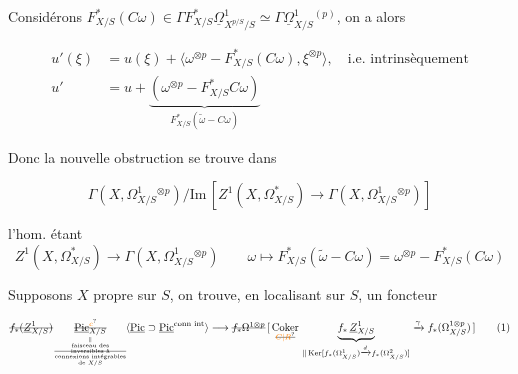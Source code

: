 



Considérons $F_{X/S}^*(C\omega)\in\Gamma F_{X/S}^*\underline\Omega^1_{X^{p/S}/S}\simeq\Gamma\underline\Omega^1_{X/S}{}^{(p)}$, on a alors

\[
\begin{aligned}
u'(\xi)&=u(\xi)+\langle\omega^{\otimes p}-F_{X/S}^*(C\omega),\xi^{\otimes p}\rangle,\quad\text{i.e. intrinsèquement}\\
u'&=u+\underbrace{(\omega^{\otimes p}-F_{X/S}^*C\omega)}_{F^*_{X/S}(\widetilde\omega-C\omega)}
\end{aligned}
\]

Donc la nouvelle obstruction se trouve dans

\[
\Gamma(X,\Omega^1_{X/S}{}^{\otimes p})/\mathrm{Im}\,[Z^1(X,\Omega^*_{X/S})\to\Gamma(X,\Omega^1_{X/S}{}^{\otimes p})]
\]

l'hom. étant
\[
Z^1(X,\Omega^*_{X/S})\longrightarrow\Gamma(X,\Omega^1_{X/S}{}^{\otimes p})\qquad
\omega\longmapsto F_{X/S}^*(\widetilde\omega-C\omega)=\omega^{\otimes p}-F_{X/S}^*(C\omega)
\]


Supposons $X$ propre sur $S$, on trouve, en localisant sur $S$, un foncteur

\[
\deleted{f_*(\underline Z^1_{X/S})}\,
\underset{\deleted{\substack{\|\\\text{faisceau des}\\\text{inversibles à}\\\text{connexions intégrables}\\\text{de }X/S}}}{\deleted{\underline{\mathrm{Pic}}_{X/S}^{\unsure{c}}}}
\inserted{\underline{\mathrm{Pic}}\supset\underline{\mathrm{Pic}}^{\text{conn int}}}
\longrightarrow \deleted{f_*\Omega^{1\otimes p}}\,
[\,\underset{\deleted{\unsure{C|R}}}{\mathrm{Coker}}\,\underbrace{f_*\,\underline Z^1_{X/S}}_{\|\,\mathrm{Ker}[f_*(\Omega^1_{X/S})\xrightarrow d f_*(\Omega^2_{X/S})]}
\xrightarrow{\gamma}f_*(\Omega^{1\otimes p}_{X/S})\,]\tag*{(1)}
\]

